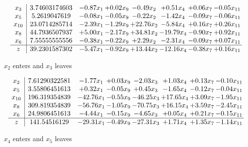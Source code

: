 \documentclass[8pt]{article}
\begin{document}
 \[\begin{array}{c| c c@{\hskip 2pt} c@{\hskip 2pt} c@{\hskip 2pt} c@{\hskip 2pt} c@{\hskip 2pt} c@{\hskip 2pt} }
 x_{3}   &  3.74603174603 & -0.87 x_{1} & +  0.02 x_{9} & -0.49 x_{2} & +  0.51 x_{4} & +  0.06 x_{7} & -0.05 x_{11}\\
 x_{5}   &  5.2619047619 & -0.08 x_{1} & -0.05 x_{9} & -0.22 x_{2} & -1.42 x_{4} & -0.09 x_{7} & -0.06 x_{11}\\
 x_{10}   &  23.0714285714 & -2.39 x_{1} & -1.29 x_{9} & + 22.76 x_{2} & -5.84 x_{4} & +  0.16 x_{7} & +  0.26 x_{11}\\
 x_{8}   &  44.7936507937 & +  5.00 x_{1} & -2.17 x_{9} & + 34.81 x_{2} & -19.79 x_{4} & -0.90 x_{7} & +  0.92 x_{11}\\
 x_{6}   &  7.55555555556 & -0.38 x_{1} & -0.22 x_{9} & +  2.29 x_{2} & -2.31 x_{4} & -0.09 x_{7} & +  0.07 x_{11}\\
\hline
z    &  39.2301587302 & -5.47 x_{1} & -0.92 x_{9} & + 13.44 x_{2} & -12.16 x_{4} & -0.38 x_{7} & +  0.16 x_{11}\\
\end{array}\]


 $ x_{2} $ enters and $ x_{3} $ leaves 

 \[\begin{array}{c| c c@{\hskip 2pt} c@{\hskip 2pt} c@{\hskip 2pt} c@{\hskip 2pt} c@{\hskip 2pt} c@{\hskip 2pt} }
 x_{2}   &  7.61290322581 & -1.77 x_{1} & +  0.03 x_{9} & -2.03 x_{3} & +  1.03 x_{4} & +  0.13 x_{7} & -0.10 x_{11}\\
 x_{5}   &  3.55806451613 & +  0.32 x_{1} & -0.05 x_{9} & +  0.45 x_{3} & -1.65 x_{4} & -0.12 x_{7} & -0.04 x_{11}\\
 x_{10}   &  196.319354839 & -42.76 x_{1} & -0.55 x_{9} & -46.25 x_{3} & + 17.65 x_{4} & +  3.09 x_{7} & -1.95 x_{11}\\
 x_{8}   &  309.819354839 & -56.76 x_{1} & -1.05 x_{9} & -70.75 x_{3} & + 16.15 x_{4} & +  3.59 x_{7} & -2.45 x_{11}\\
 x_{6}   &  24.9806451613 & -4.44 x_{1} & -0.15 x_{9} & -4.65 x_{3} & +  0.05 x_{4} & +  0.21 x_{7} & -0.15 x_{11}\\
\hline
z    &  141.54516129 & -29.31 x_{1} & -0.49 x_{9} & -27.31 x_{3} & +  1.71 x_{4} & +  1.35 x_{7} & -1.14 x_{11}\\
\end{array}\]


 $ x_{4} $ enters and $ x_{5} $ leaves 
\end{document}
